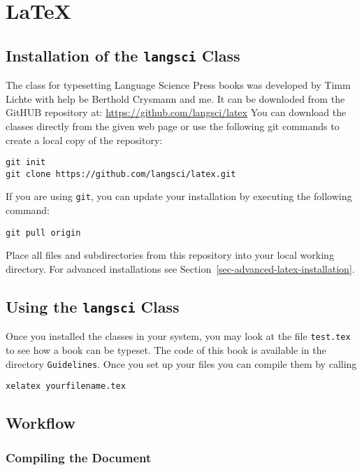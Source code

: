 \chapter{\LaTeX}

\section{Installation of the \texttt{langsci} Class}

The \latex class for typesetting Language Science Press books was developed by Timm Lichte with
help be Berthold Crysmann and me. It can be downloded from the GitHUB repository at: \url{https://github.com/langsci/latex}
You can download the classes directly from the given web page or use the following git commands to
create a local copy of the repository:
\begin{verbatim}
git init
git clone https://github.com/langsci/latex.git 
\end{verbatim}
If you are using \texttt{git}, you can update your installation by executing the following command:
\begin{verbatim}
git pull origin
\end{verbatim}

Place all files and subdirectories from this repository into your local working directory. For
advanced installations see Section~\ref{sec-advanced-latex-installation}.

\section{Using the \texttt{langsci} Class}

Once you installed the classes in your system, you may look at the file \texttt{test.tex} to see how
a book can be typeset. The code of this book is available in the directory \texttt{Guidelines}. Once
you set up your \latex files you can compile them by calling 
\begin{verbatim}
xelatex yourfilename.tex
\end{verbatim}



\section{Workflow}

\subsection{Compiling the Document}

